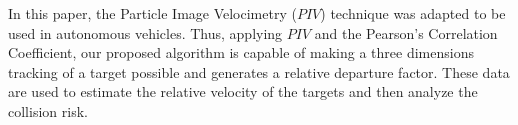 In this paper, the Particle Image Velocimetry ($PIV$) technique was adapted to be used in autonomous vehicles.
Thus, applying $PIV$ and the Pearson’s Correlation Coefficient, our proposed algorithm 
is capable of making a three dimensions tracking of a target possible 
and generates a relative departure factor. These data are used to estimate the 
relative velocity of the targets and then analyze the collision risk.